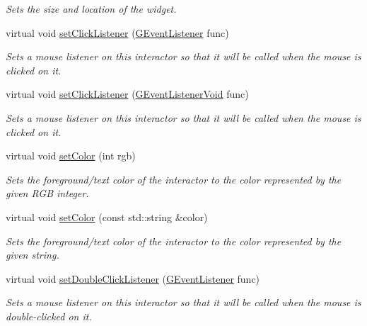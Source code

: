 \begin{DoxyCompactItemize}
\begin{DoxyCompactList}\small\item\em Sets the size and location of the widget. \end{DoxyCompactList}\item 
virtual void \mbox{\hyperlink{classsgl_1_1GInteractor_abd40af6921242584d0954f173911b190}{set\+Click\+Listener}} (\mbox{\hyperlink{namespacesgl_ae9f3e9eab70035da1a2b114e21357b25}{G\+Event\+Listener}} func)
\begin{DoxyCompactList}\small\item\em Sets a mouse listener on this interactor so that it will be called when the mouse is clicked on it. \end{DoxyCompactList}\item 
virtual void \mbox{\hyperlink{classsgl_1_1GInteractor_a856414c92df90f56f3877475eb3f8fc4}{set\+Click\+Listener}} (\mbox{\hyperlink{namespacesgl_a54427ce97bb1c2804e4fe2b0a62e8b17}{G\+Event\+Listener\+Void}} func)
\begin{DoxyCompactList}\small\item\em Sets a mouse listener on this interactor so that it will be called when the mouse is clicked on it. \end{DoxyCompactList}\item 
virtual void \mbox{\hyperlink{classsgl_1_1GInteractor_ab1f5cc0f5cc6bbbd716a526c61f1081d}{set\+Color}} (int rgb)
\begin{DoxyCompactList}\small\item\em Sets the foreground/text color of the interactor to the color represented by the given R\+GB integer. \end{DoxyCompactList}\item 
virtual void \mbox{\hyperlink{classsgl_1_1GInteractor_a61374df6c11b52cfbb0815decdbaebc6}{set\+Color}} (const std\+::string \&color)
\begin{DoxyCompactList}\small\item\em Sets the foreground/text color of the interactor to the color represented by the given string. \end{DoxyCompactList}\item 
virtual void \mbox{\hyperlink{classsgl_1_1GInteractor_ac29f9a3462458e165fae3a1f046ee77a}{set\+Double\+Click\+Listener}} (\mbox{\hyperlink{namespacesgl_ae9f3e9eab70035da1a2b114e21357b25}{G\+Event\+Listener}} func)
\begin{DoxyCompactList}\small\item\em Sets a mouse listener on this interactor so that it will be called when the mouse is double-\/clicked on it. \end{DoxyCompactList}\item 

\end{DoxyCompactItemize}
